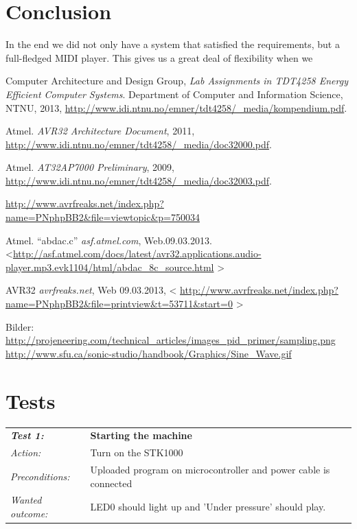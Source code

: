 \documentclass[a4paper,12pt]{article}
\begin{document}
\section{Conclusion}
In the end we did not only have a system that satisfied the requirements, but a full-fledged MIDI player. This gives us a great deal of flexibility when we 
\clearpage

\begin{thebibliography}{9}

Computer Architecture and Design Group,
\emph{Lab Assignments in TDT4258 Energy Efficient Computer Systems}.
Department of Computer and Information Science, NTNU,
2013,
\url{http://www.idi.ntnu.no/emner/tdt4258/\_media/kompendium.pdf}.

Atmel.
\emph{AVR32 Architecture Document},
2011,
\url{http://www.idi.ntnu.no/emner/tdt4258/\_media/doc32000.pdf}.

Atmel.
\emph{AT32AP7000 Preliminary},
2009,
\url{http://www.idi.ntnu.no/emner/tdt4258/\_media/doc32003.pdf}.

\url{http://www.avrfreaks.net/index.php?name=PNphpBB2&file=viewtopic&p=750034}

Atmel. “abdac.c”
\emph{asf.atmel.com},
Web.09.03.2013.
\textless \url{http://asf.atmel.com/docs/latest/avr32.applications.audio-player.mp3.evk1104/html/abdac_8c_source.html}
\textgreater

AVR32
\emph{avrfreaks.net},
Web 09.03.2013,
\textless
\url{http://www.avrfreaks.net/index.php?name=PNphpBB2&file=printview&t=53711&start=0}
\textgreater

\end{thebibliography}

Bilder:
\url{http://projeneering.com/technical_articles/images_pid_primer/sampling.png}
\url{http://www.sfu.ca/sonic-studio/handbook/Graphics/Sine_Wave.gif}



\clearpage
\appendix
{}
\section{Tests}

\begin{tabular}[h]{|lp{12cm}|} \hline
\textbf{\emph{Test 1:}} 		& \textbf{Starting the machine}\\
\emph{Action:} 		& Turn on the STK1000\\
\emph{Preconditions:}	& Uploaded program on microcontroller and power cable is connected\\
\emph{Wanted outcome:}	& LED0 should light up and 'Under pressure' should play. \\ \hline
\end{tabular}
\vspace{1cm}
\end{document}
